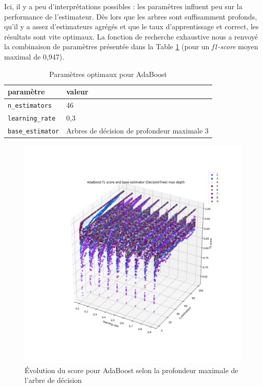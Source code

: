 \documentclass[a4paper]{report}
\begin{document}
Ici, il y a peu d'interprétations possibles : les paramètres influent peu sur la performance de l'estimateur. Dès lors que les arbres sont suffisamment profonds, qu'il y a assez d'estimateurs agrégés et que le taux d'apprentissage et correct, les résultats sont vite optimaux. La fonction de recherche exhaustive nous a renvoyé la combinaison de paramètres présentée dans la Table \ref{best_params_ada} (pour un \emph{f1-score} moyen maximal de 0,947).

\begin{table}[h]
\centering
\begin{tabular}{ll}
paramètre & valeur \\
\hline
\texttt{n\_estimators} & 46 \\
\texttt{learning\_rate} & 0,3 \\
\texttt{base\_estimator} & Arbres de décision de profondeur maximale 3\\
\end{tabular}
\caption{Paramètres optimaux pour AdaBoost\label{best_params_ada}}
\end{table}

\begin{figure}
\centering
\includegraphics[width=\textwidth]{img/adaboost_depth.png}
\caption{Évolution du score pour AdaBoost selon la profondeur maximale de l'arbre de décision\label{adaboost_depth}}
\end{figure}
\end{document}
